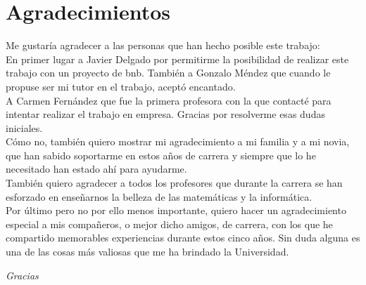 \chapter*{Agradecimientos}
	Me gustaría agradecer a las personas que han hecho posible este trabajo:\\
	
	En primer lugar a Javier Delgado por permitirme la posibilidad de realizar este trabajo con un proyecto de \acrfull{bnb}.
	También a Gonzalo Méndez que cuando le propuse ser mi tutor en el trabajo, aceptó encantado.\\

	A Carmen Fernández que fue la primera profesora con la que contacté para intentar realizar el trabajo en empresa.
	Gracias por resolverme esas dudas iniciales.\\
	
	Cómo no, también quiero mostrar mi agradecimiento a mi familia y a mi novia, 
	que han sabido soportarme en estos años de carrera y siempre que lo he necesitado han estado ahí para ayudarme.\\
	
	También quiero agradecer a todos los profesores que durante la carrera se han esforzado en enseñarnos la belleza de las matemáticas y la informática.\\
	
	Por último pero no por ello menos importante, quiero hacer un agradecimiento especial a mis compañeros, o mejor dicho amigos, de carrera, 
	con los que he compartido memorables experiencias durante estos cinco años. Sin duda alguna es una de las cosas más valiosas que me ha brindado la Universidad.\\
	
	
	\begin{center}
		\textit{Gracias}
	\end{center}
	
	
	
	

		
